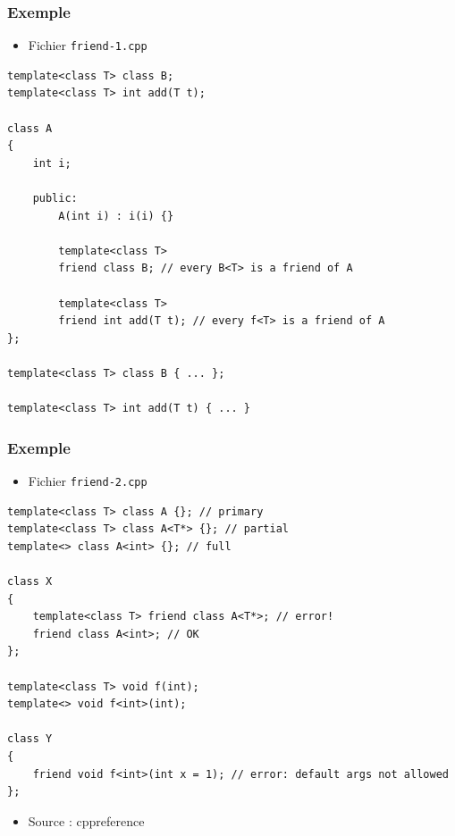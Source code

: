 \begin{frame}[containsverbatim]
\frametitle{Exemple}
\begin{itemize}
\item Fichier \texttt{friend-1.cpp}
\end{itemize}
\begin{lstlisting}
template<class T> class B;
template<class T> int add(T t);

class A 
{
	int i;

	public:	
		A(int i) : i(i) {}

	    template<class T>
    	friend class B; // every B<T> is a friend of A
 
    	template<class T>
    	friend int add(T t); // every f<T> is a friend of A
};

template<class T> class B { ... };

template<class T> int add(T t) { ... }
\end{lstlisting}
\end{frame}

\begin{frame}[containsverbatim]
\frametitle{Exemple}
\begin{itemize}
\item Fichier \texttt{friend-2.cpp}
\end{itemize}
\begin{lstlisting}
template<class T> class A {}; // primary
template<class T> class A<T*> {}; // partial
template<> class A<int> {}; // full

class X 
{
    template<class T> friend class A<T*>; // error!
    friend class A<int>; // OK
};

template<class T> void f(int);
template<> void f<int>(int);
 
class Y 
{
    friend void f<int>(int x = 1); // error: default args not allowed
};
\end{lstlisting}
\begin{itemize}
\item Source : cppreference
\end{itemize}
\end{frame}

